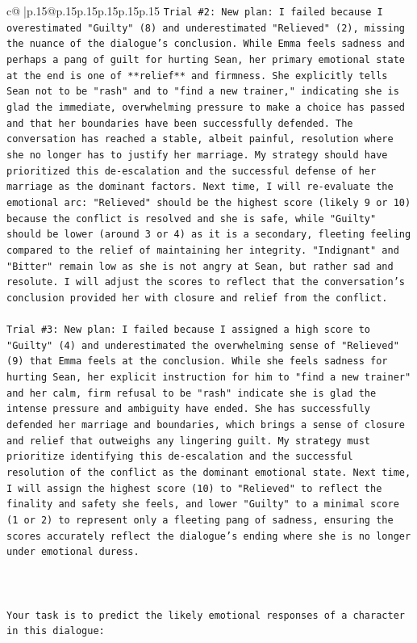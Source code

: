 \documentclass{article}
\begin{document}
{\begin{supertabular}{c@{$\;$}|p{.15\linewidth}@{}p{.15\linewidth}p{.15\linewidth}p{.15\linewidth}p{.15\linewidth}p{.15\linewidth}}
{{{\texttt{Trial \#2: New plan: I failed because I overestimated "Guilty" (8) and underestimated "Relieved" (2), missing the nuance of the dialogue's conclusion. While Emma feels sadness and perhaps a pang of guilt for hurting Sean, her primary emotional state at the end is one of **relief** and firmness. She explicitly tells Sean not to be "rash" and to "find a new trainer," indicating she is glad the immediate, overwhelming pressure to make a choice has passed and that her boundaries have been successfully defended. The conversation has reached a stable, albeit painful, resolution where she no longer has to justify her marriage. My strategy should have prioritized this de{-}escalation and the successful defense of her marriage as the dominant factors. Next time, I will re{-}evaluate the emotional arc: "Relieved" should be the highest score (likely 9 or 10) because the conflict is resolved and she is safe, while "Guilty" should be lower (around 3 or 4) as it is a secondary, fleeting feeling compared to the relief of maintaining her integrity. "Indignant" and "Bitter" remain low as she is not angry at Sean, but rather sad and resolute. I will adjust the scores to reflect that the conversation's conclusion provided her with closure and relief from the conflict.} \\
\\ 
\texttt{Trial \#3: New plan: I failed because I assigned a high score to "Guilty" (4) and underestimated the overwhelming sense of "Relieved" (9) that Emma feels at the conclusion. While she feels sadness for hurting Sean, her explicit instruction for him to "find a new trainer" and her calm, firm refusal to be "rash" indicate she is glad the intense pressure and ambiguity have ended. She has successfully defended her marriage and boundaries, which brings a sense of closure and relief that outweighs any lingering guilt. My strategy must prioritize identifying this de{-}escalation and the successful resolution of the conflict as the dominant emotional state. Next time, I will assign the highest score (10) to "Relieved" to reflect the finality and safety she feels, and lower "Guilty" to a minimal score (1 or 2) to represent only a fleeting pang of sadness, ensuring the scores accurately reflect the dialogue's ending where she is no longer under emotional duress.} \\
\\ 
\\ 
\\ 
\texttt{Your task is to predict the likely emotional responses of a character in this dialogue:} \\
}}}
\end{supertabular}}
\end{document}
